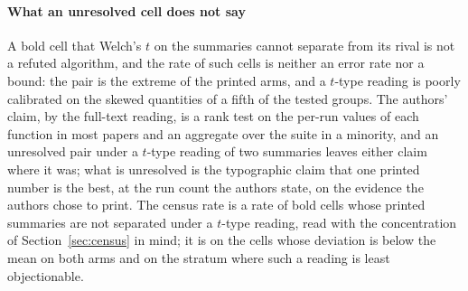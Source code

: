 \documentclass[preprint,review,12pt]{elsarticle}
\begin{document}
\paragraph{What an unresolved cell does not say} A bold cell that Welch's $t$ on the summaries cannot separate from its rival is not a refuted algorithm, and the rate of such cells is neither an error rate nor a bound: the pair is the extreme of the printed arms, and a $t$-type reading is poorly calibrated on the skewed quantities of a fifth of the tested groups. The authors' claim, by the full-text reading, is a rank test on the per-run values of each function in most papers and an aggregate over the suite in a minority, and an unresolved pair under a $t$-type reading of two summaries leaves either claim where it was; what is unresolved is the typographic claim that one printed number is the best, at the run count the authors state, on the evidence the authors chose to print. The census rate is a rate of bold cells whose printed summaries are not separated under a $t$-type reading, read with the concentration of Section~\ref{sec:census} in mind; it is \nCrcShSdLtMeanFail{} on the cells whose deviation is below the mean on both arms and \nCrcLeastFail{} on the stratum where such a reading is least objectionable.
\end{document}
